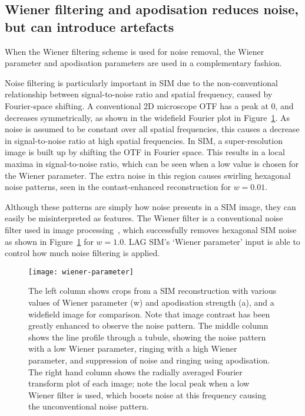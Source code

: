 \subsection{Wiener filtering and apodisation reduces noise, but can introduce artefacts}
When the Wiener filtering scheme is used for noise removal, the Wiener parameter and apodisation parameters are used in a complementary fashion. 

Noise filtering is particularly important in SIM due to the non-conventional relationship between signal-to-noise ratio and spatial frequency, caused by Fourier-space shifting. 
A conventional 2D microscope OTF has a peak at 0, and decreases symmetrically, as shown in the widefield Fourier plot in Figure~\ref{fig:wiener-parameter}. 
As noise is assumed to be constant over all spatial frequencies, this causes a decrease in signal-to-noise ratio at high spatial frequencies. 
In SIM, a super-resolution image is built up by shifting the OTF in Fourier space. 
This results in a local maxima in signal-to-noise ratio, which can be seen when a low value is chosen for the Wiener parameter. 
The extra noise in this region causes swirling hexagonal noise patterns, seen in the contast-enhanced reconstruction for $w=0.01$. 

Although these patterns are simply how noise presents in a SIM image, they can easily be misinterpreted as features. 
The Wiener filter is a conventional noise filter used in image processing~\cite[\textit{ch. 4}]{brown2012introduction}, which successfully removes hexagonal SIM noise as shown in Figure~\ref{fig:wiener-parameter} for $w=1.0$. 
LAG SIM's `Wiener parameter' input is able to control how much noise filtering is applied. 


\begin{figure}[p]
\centering
\texttt{[image: wiener-parameter]}
\caption[LAG SIM: The Wiener parameter and apodisation strength must be chosen to minimise artefacts]{The left column shows crops from a SIM reconstruction with various values of Wiener parameter (w) and apodisation strength (a), and a widefield image for comparison. Note that image contrast has been greatly enhanced to observe the noise pattern. The middle column shows the line profile through a tubule, showing the noise pattern with a low Wiener parameter, ringing with a high Wiener parameter, and suppression of noise and ringing using apodisation. The right hand column shows the radially averaged Fourier transform plot of each image; note the local peak when a low Wiener filter is used, which boosts noise at this frequency causing the unconventional noise pattern.}
\label{fig:wiener-parameter}
\end{figure}

